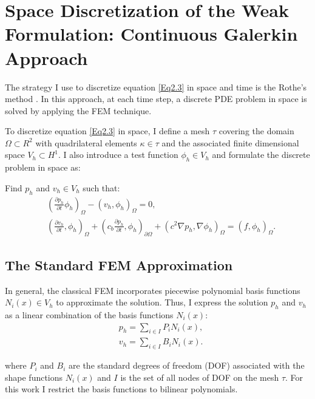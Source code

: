 \section{Space Discretization of the Weak Formulation: Continuous Galerkin Approach}
The strategy I use to discretize equation \ref{Eq2.3} in space and time is the Rothe's method \cite{Rothe1930}. In this approach, at each time step, a discrete PDE problem in space is solved by applying the FEM technique. 

To discretize equation \ref{Eq2.3} in space, I define a mesh $\tau$ covering the domain $\Omega \subset R^2$ with quadrilateral elements $\kappa \in \tau$ and the associated finite dimensional space $V_h  \subset H^1$. I also introduce a test function $\phi_h \in  V_h$ and formulate the discrete problem in space as:

Find $p_h$ and $v_h \in V_h$ such that:
 \begin{equation} \label{Eq2.4}
 \begin{split}
   &\left( \frac{\partial p_h}{\partial t}  \phi_h \right)_\Omega - \left( v_h, \phi_h \right)_\Omega    =0,\\
   & \left( \frac{\partial v_h}{\partial t}, \phi_h \right)_\Omega  + \left(  c_b \frac{\partial p_h}{\partial t} , \phi_h  \right)_{\partial \Omega} +
   \left(  c^2 \nabla p_h, \nabla \phi_h  \right)_\Omega = \left( f, \phi_h \right)_\Omega . 
 \end{split}
 \end{equation}
 
\subsection{The Standard FEM Approximation}
In general, the classical FEM incorporates piecewise polynomial basis functions $N_i (x) \in V_h$ to approximate the solution. Thus, I express the solution $p_h$ and $v_h$ as a linear combination of the basis functions $N_i(x)$:
 \begin{equation} \label{Eq2.5}
 \begin{split}
   & p_h=\sum_{i \in I}  P_i N_i(x),\\
   & v_h=\sum_{i \in I} B_i N_i(x).
 \end{split}
 \end{equation}

where $P_i$ and $B_i$ are the standard degrees of freedom (DOF) associated with the shape functions $N_i(x)$ and $I$ is the set of all nodes of DOF on the mesh $\tau$. For this work I restrict the basis functions to bilinear polynomials. 

